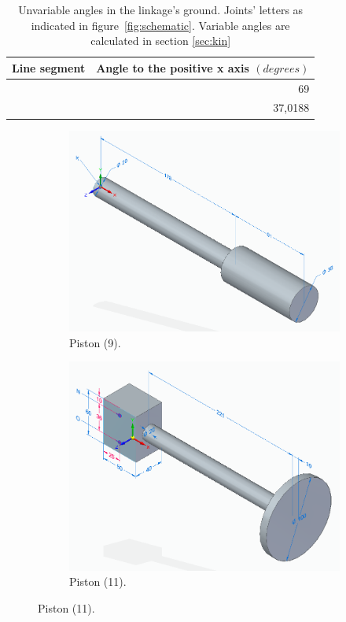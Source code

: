 \documentclass[a4paper]{article}
\begin{document}
\begin{table} 
	\centering
	\begin{tabular}{lr}
		\hline
		Line segment & Angle to the positive x axis \((\si{degrees})\) \\
		\hline
		[AE] & 69 \\
		\text{[AF]} & 37,0188 \\
		\hline
	\end{tabular}
	\caption{Unvariable angles in the linkage's ground. Joints' letters as indicated in figure~\ref{fig:schematic}. Variable angles are calculated in section \ref{sec:kin}}
	\label{tab:angles}
\end{table}


\begin{figure}[b]
	\centering
	
	\begin{subfigure}[b]{.4\textwidth}
		\centering
		\label{fig:piston9}
		\includegraphics[width=\textwidth]{piston9.png}
		\caption{Piston (9).\centering}
	\end{subfigure}
	\hfill
	\begin{subfigure}[b]{.4\textwidth}
		\centering
		\label{fig:piston11}
		\includegraphics[width=\textwidth]{piston11.png}
		\caption{Piston (11).\centering}
	\end{subfigure}


\end{figure}
\end{document}
